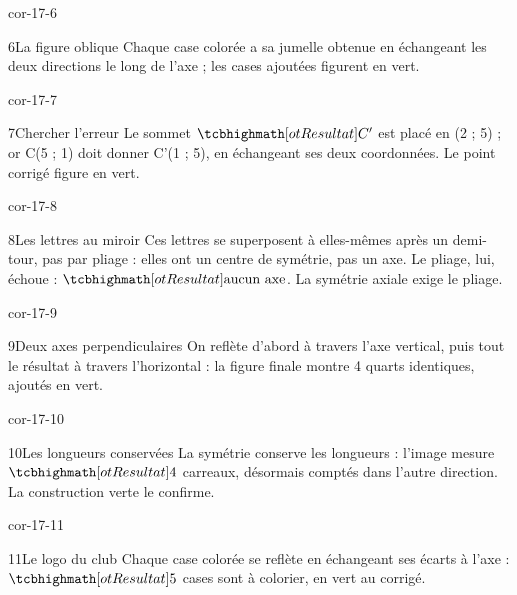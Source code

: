 \begin{blocLivre}{cor-17-6}\begin{corrige}{6}{La figure oblique}
Chaque case colorée a sa jumelle obtenue en échangeant les deux directions le long de l’axe ; les cases ajoutées figurent en vert.
\label{fig-cor-17-6}
\end{corrige}\end{blocLivre}
\begin{blocLivre}{cor-17-7}\begin{corrige}{7}{Chercher l’erreur}
Le sommet $\res{C'}$ est placé en (2 ; 5) ; or C(5 ; 1) doit donner C'(1 ; 5), en échangeant ses deux coordonnées. Le point corrigé figure en vert.
\label{fig-cor-17-7}
\end{corrige}\end{blocLivre}
\begin{blocLivre}{cor-17-8}\begin{corrige}{8}{Les lettres au miroir}
Ces lettres se superposent à elles-mêmes après un demi-tour, pas par pliage : elles ont un centre de symétrie, pas un axe. Le pliage, lui, échoue : $\res{\text{aucun axe}}$. La symétrie axiale exige le pliage.
\label{fig-cor-17-8}
\end{corrige}\end{blocLivre}
\begin{blocLivre}{cor-17-9}\begin{corrige}{9}{Deux axes perpendiculaires}
On reflète d’abord à travers l’axe vertical, puis tout le résultat à travers l’horizontal : la figure finale montre 4 quarts identiques, ajoutés en vert.
\label{fig-cor-17-9}
\end{corrige}\end{blocLivre}
\begin{blocLivre}{cor-17-10}\begin{corrige}{10}{Les longueurs conservées}
La symétrie conserve les longueurs : l’image mesure $\res4$ carreaux, désormais comptés dans l’autre direction. La construction verte le confirme.
\label{fig-cor-17-10}
\end{corrige}\end{blocLivre}
\begin{blocLivre}{cor-17-11}\begin{corrige}{11}{Le logo du club}
Chaque case colorée se reflète en échangeant ses écarts à l’axe : $\res5$ cases sont à colorier, en vert au corrigé.
\label{fig-cor-17-11}
\end{corrige}\end{blocLivre}
